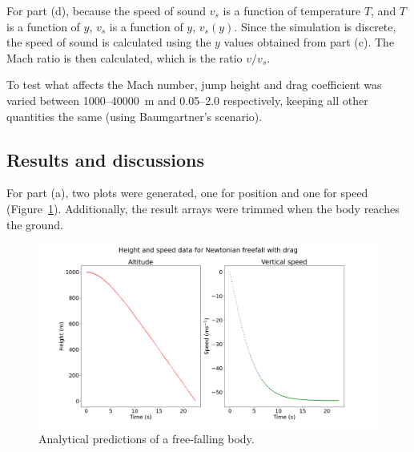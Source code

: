 \documentclass[hyphens,twocolumn,nobalancelastpage,aps,10pt,citeautoscript,longbibliography]{revtex4-2}
\begin{document}
For part (d), because the speed of sound $v_s$ is a function of temperature
$T$, and $T$ is a function of $y$, $v_s$ is a function of $y$, $v_s(y)$. Since
the simulation is discrete, the speed of sound is calculated using the $y$
values obtained from part (c). The Mach ratio is then calculated, which is the
ratio $v/v_s$.

To test what affects the Mach number, jump height and drag coefficient was
varied between 1000--\qty{40000}{\metre} and 0.05--2.0 respectively, keeping
all other quantities the same (using Baumgartner's scenario).

\subsection{Results and discussions}%
\label{sub:results_and_discussions_1}

\noindent For part (a), two plots were generated, one for
position and one for speed (Figure~\ref{fig:freefall_analytic}). Additionally,
the result arrays were trimmed when the body reaches the ground.
\begin{figure}[htpb]
	\centering
	\includegraphics[width=\linewidth]{freefall_analytic.png}
	\caption{Analytical predictions of a free-falling body.}%
	\label{fig:freefall_analytic}
\end{figure}
\end{document}
